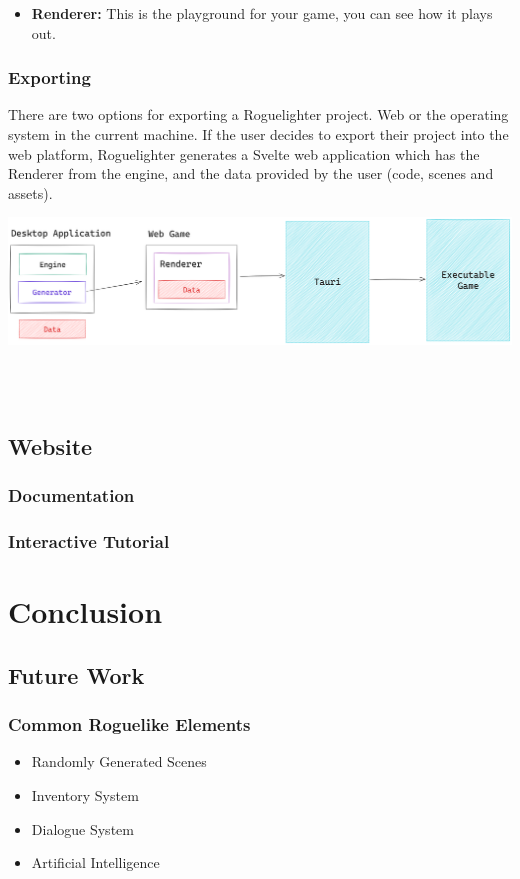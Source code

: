 \documentclass{article}
\begin{document}
\begin{itemize}
    \item \textbf{Renderer:} This is the playground for your game, you can see how it plays out.  
\end{itemize}
\subsubsection{Exporting}
There are two options for exporting a Roguelighter project. Web or the operating system in the current machine. If the user decides to export their project into the web platform, Roguelighter generates a Svelte web application which has the Renderer from the engine, and the data provided by the user (code, scenes and assets).\\

\begin{minipage}{\linewidth}
    \centering
    \includegraphics[width=1\textwidth]{tauri.png}
\end{minipage}\\\\

\subsection{Website}
\subsubsection{Documentation}
\subsubsection{Interactive Tutorial}

\section{Conclusion}
\subsection{Future Work}
\subsubsection{Common Roguelike Elements}
\begin{itemize}
    \item{Randomly Generated Scenes}
    \item{Inventory System}
    \item{Dialogue System}
    \item{Artificial Intelligence}
\end{itemize}
\end{document}
